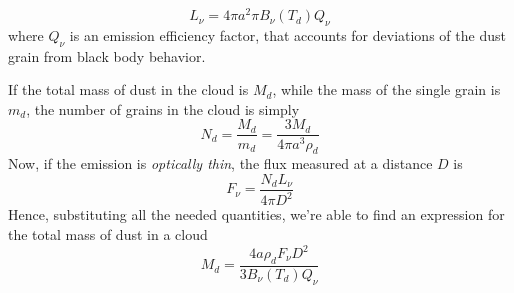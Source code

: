 \begin{equation}
    L_{\nu} = 4\pi a^{2}\pi B_{\nu}(T_{d})Q_{\nu}
\end{equation}
where $Q_{\nu}$ is an emission efficiency factor, that accounts for deviations of the dust grain from black body behavior.
\par If the total mass of dust in the cloud is $M_{d}$, while the mass of the single grain is $m_{d}$, the number of grains in the cloud is simply 
\begin{equation}
    N_{d} = \frac{M_{d}}{m_{d}} = \frac{3M_{d}}{4\pi a^{3}\rho_{d}}
\end{equation}
Now, if the emission is \emph{optically thin}, the flux measured at a distance $D$ is 
\begin{equation}
    F_{\nu} = \frac{N_{d}L_{\nu}}{4\pi D^{2}}
\end{equation}
Hence, substituting all the needed quantities, we're able to find an expression for the total mass of dust in a cloud
\begin{equation}
    M_{d} = \frac{4a\rho_{d}F_{\nu}D^{2}}{3B_{\nu}(T_{d})Q_{\nu}}
    \label{eq:dustmass}
\end{equation}